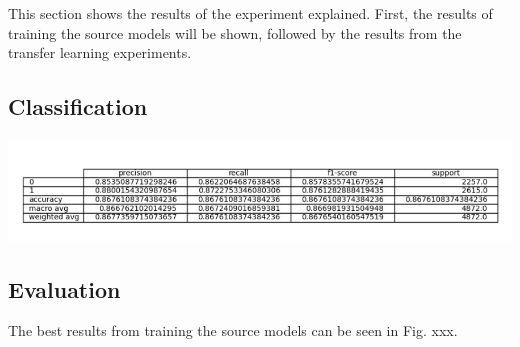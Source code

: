This section shows the results of the experiment explained. First, the results of training the source models  will be shown, followed by the results from the transfer
learning experiments.

\subsection{Classification}
\centering
\includegraphics[width=.5\textwidth]{figures/classification.PNG}
\hfill \break


\subsection{Evaluation}
The best results from training the source models can be
 seen in Fig. xxx. 
 